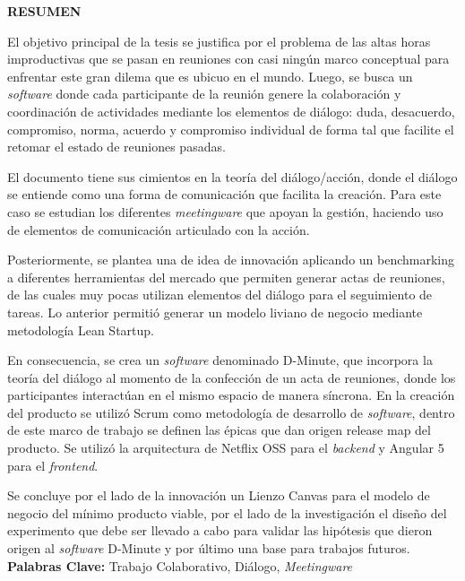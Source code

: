 \begin{center}
\textbf{RESUMEN}
\end{center}

El objetivo principal de la tesis se justifica por el problema de las altas horas improductivas que se pasan en reuniones con casi ningún marco conceptual para enfrentar este gran dilema que es ubicuo en el mundo. Luego,  se busca un \textit{software} donde cada participante de la reunión genere la colaboración y coordinación de actividades mediante los elementos de diálogo: duda, desacuerdo, compromiso, norma, acuerdo y compromiso individual de forma tal que facilite el retomar el estado de reuniones pasadas. 

El documento tiene sus cimientos en la teoría del diálogo/acción, donde el diálogo se entiende como una forma de comunicación que facilita la creación. Para este caso se estudian los diferentes \textit{meetingware} que apoyan la gestión, haciendo uso de elementos de comunicación articulado con la acción.

Posteriormente, se plantea una de idea de innovación aplicando un benchmarking a diferentes herramientas del mercado que permiten generar actas de reuniones, de las cuales muy pocas utilizan elementos del diálogo para el seguimiento de tareas. Lo anterior permitió generar un modelo liviano de negocio mediante metodología Lean Startup.

En consecuencia, se crea un \textit{software} denominado D-Minute, que incorpora la teoría del diálogo al momento de la confección de un acta de reuniones, donde los participantes interactúan en el mismo espacio de manera síncrona. En la creación del producto se utilizó Scrum como metodología de desarrollo de \textit{software}, dentro de este marco de trabajo se definen las épicas que dan origen release map del producto. Se utilizó la arquitectura de Netflix OSS para el \textit{backend} y Angular 5 para el \textit{frontend}. 

Se concluye por el lado de la innovación un Lienzo Canvas para el modelo de negocio del mínimo producto viable, por el lado de la investigación el diseño del experimento que debe ser llevado a cabo para validar las hipótesis que dieron origen al \textit{software} D-Minute y por último una base para trabajos futuros.\newline 
\newline\textbf{Palabras Clave:} Trabajo Colaborativo, Diálogo, \textit{Meetingware}